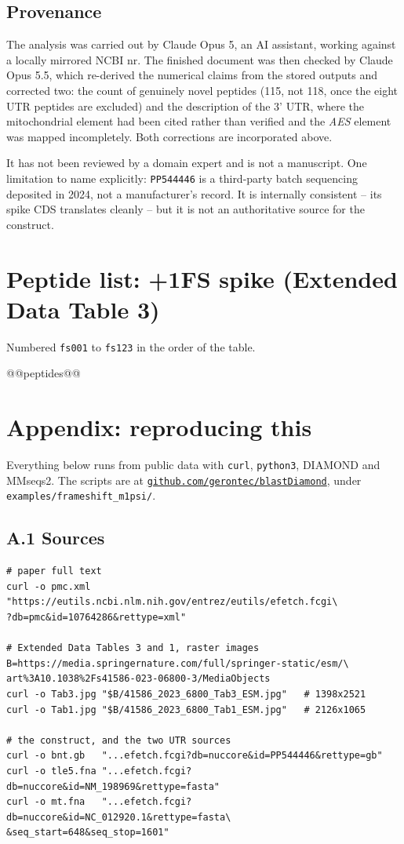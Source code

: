 \documentclass[11pt,a4paper]{article}
\begin{document}
\subsection*{Provenance}

The analysis was carried out by Claude Opus 5, an AI assistant, working
against a locally mirrored NCBI nr. The finished document was then checked by
Claude Opus 5.5, which re-derived the numerical claims from the stored outputs
and corrected two: the count of genuinely novel peptides (115, not 118, once
the eight UTR peptides are excluded) and the description of the 3' UTR, where
the mitochondrial element had been cited rather than verified and the
\emph{AES} element was mapped incompletely. Both corrections are incorporated
above.

It has not been reviewed by a domain expert and is not a manuscript. One
limitation to name explicitly: \texttt{PP544446} is a third-party batch
sequencing deposited in 2024, not a manufacturer's record. It is internally
consistent -- its spike CDS translates cleanly -- but it is not an
authoritative source for the construct.

\section{Peptide list: +1FS spike (Extended Data Table 3)}
\label{sec:list}

Numbered \texttt{fs001} to \texttt{fs123} in the order of the table.

\footnotesize
@@peptides@@
\normalsize

\section{Appendix: reproducing this}

Everything below runs from public data with \texttt{curl}, \texttt{python3},
DIAMOND and MMseqs2. The scripts are at
\href{https://github.com/gerontec/blastDiamond}{\texttt{github.com/gerontec/blastDiamond}},
under \texttt{examples/frameshift\_m1psi/}.

\subsection*{A.1 Sources}

\begin{lstlisting}
# paper full text
curl -o pmc.xml "https://eutils.ncbi.nlm.nih.gov/entrez/eutils/efetch.fcgi\
?db=pmc&id=10764286&rettype=xml"

# Extended Data Tables 3 and 1, raster images
B=https://media.springernature.com/full/springer-static/esm/\
art%3A10.1038%2Fs41586-023-06800-3/MediaObjects
curl -o Tab3.jpg "$B/41586_2023_6800_Tab3_ESM.jpg"   # 1398x2521
curl -o Tab1.jpg "$B/41586_2023_6800_Tab1_ESM.jpg"   # 2126x1065

# the construct, and the two UTR sources
curl -o bnt.gb   "...efetch.fcgi?db=nuccore&id=PP544446&rettype=gb"
curl -o tle5.fna "...efetch.fcgi?db=nuccore&id=NM_198969&rettype=fasta"
curl -o mt.fna   "...efetch.fcgi?db=nuccore&id=NC_012920.1&rettype=fasta\
&seq_start=648&seq_stop=1601"
\end{lstlisting}
\end{document}
